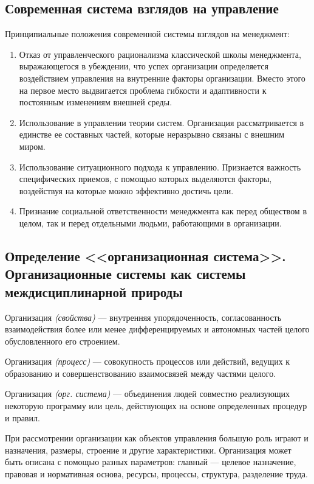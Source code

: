 \documentclass[a4paper,12pt,oneside,final]{extarticle}
\numberwithin{equation}{section}
\begin{document}
\subsection{Современная система взглядов на управление}
Принципиальные положения современной системы взглядов на менеджмент:
\begin{enumerate}
	\item Отказ от управленческого рационализма классической школы менеджмента, выражающегося в убеждении, что успех организации определяется воздействием  управления на внутренние факторы организации. 
	Вместо этого на первое место выдвигается проблема гибкости и адаптивности к постоянным изменениям внешней среды.
	\item Использование в управлении теории систем. 
	Организация рассматривается в единстве ее составных частей, которые неразрывно  связаны с внешним миром.
	\item Использование ситуационного подхода к управлению. 
	Признается важность специфических приемов, с помощью которых выделяются факторы, воздействуя на которые можно эффективно достичь цели.
	\item Признание социальной ответственности менеджмента как перед обществом в целом, так и перед отдельными людьми, работающими в организации. 
\end{enumerate}

\subsection{Определение <<организационная система>>. Организационные системы как системы междисциплинарной природы}
Организация \textit{(свойства)} --- внутренняя упорядоченность, согласованность взаимодействия более или менее дифференцируемых и автономных частей целого обусловленного его строением.

Организация \textit{(процесс)} --- совокупность процессов или действий, ведущих к образованию и совершенствованию взаимосвязей между частями целого.

Организация \textit{(орг. система)} --- объединения людей совместно реализующих некоторую программу или цель, действующих на основе определенных процедур и правил.

При рассмотрении организации как объектов управления большую роль играют и назначения, размеры, строение и другие характеристики. 
Организация может быть описана с помощью разных параметров: главный --- целевое назначение, правовая и нормативная основа, ресурсы, процессы, структура, разделение труда.
\end{document}
